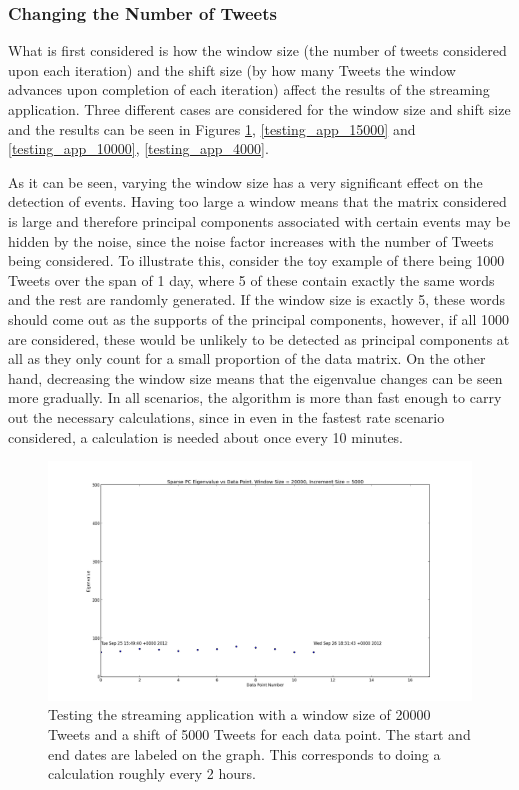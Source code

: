 \documentclass[11pt,a4paper]{article}
\begin{document}
\subsubsection{Changing the Number of Tweets}
 
What is first considered is how the window size (the number of tweets considered upon each iteration) and the shift size (by how many Tweets the window advances upon completion of each iteration) affect the results of the streaming application. Three different cases are considered for the window size and shift size and the results can be seen in Figures \ref{testing_app_20000}, \ref{testing_app_15000} and \ref{testing_app_10000}, \ref{testing_app_4000}. 

As it can be seen, varying the window size has a very significant effect on the detection of events. Having too large a window means that the matrix considered is large and therefore principal components associated with certain events may be hidden by the noise, since the noise factor increases with the number of Tweets being considered. To illustrate this, consider the toy example of there being 1000 Tweets over the span of 1 day, where 5 of these contain exactly the same words and the rest are randomly generated. If the window size is exactly 5, these words should come out as the supports of the principal components, however, if all 1000 are considered, these would be unlikely to be detected as principal components at all as they only count for a small proportion of the data matrix. On the other hand, decreasing  the window size means that the eigenvalue changes can be seen more gradually. In all scenarios, the algorithm is more than fast enough to carry out the necessary calculations, since in even in the fastest rate scenario considered, a calculation is needed about once every 10 minutes.  

\begin{figure}[H]
\centering
\includegraphics[scale=0.25]{Testing_Streaming_App_20000_5000.png}
\caption{Testing the streaming application with a window size of 20000 Tweets and a shift of 5000 Tweets for each data point. The start and end dates are labeled on the graph. This corresponds to doing a calculation roughly every 2 hours.}
\label{testing_app_20000}
\end{figure}
\end{document}
